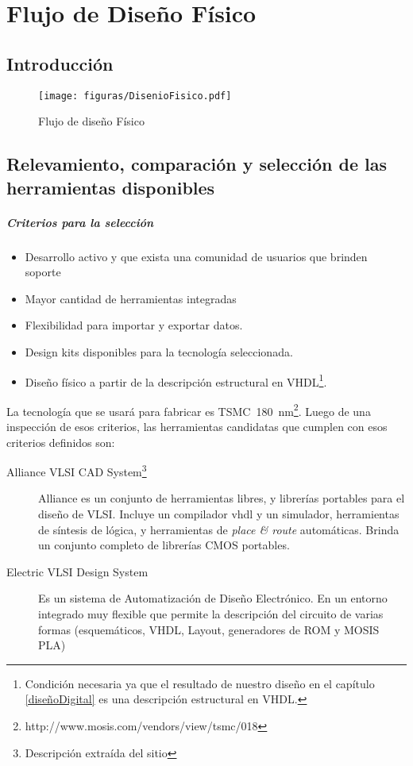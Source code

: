 \chapter{Flujo de Diseño Físico}
\section{Introducción}
\begin{figure}[h]
\centering
\texttt{[image: figuras/DisenioFisico.pdf]}
  \caption{Flujo de diseño Físico}
  \label{fig:diseñoFisico}
\end{figure}


\section{Relevamiento, comparación y selección de las herramientas disponibles}
\paragraph{Criterios para la selección}
\begin{itemize}
\item Desarrollo activo y que exista una comunidad de usuarios que brinden soporte
\item Mayor cantidad de herramientas integradas
\item Flexibilidad para importar y exportar datos. 
\item Design kits disponibles para la tecnología seleccionada.
\item Diseño físico a partir de la descripción estructural en VHDL\footnote{Condición necesaria ya que el resultado de nuestro diseño en el capítulo \ref{diseñoDigital} es una descripción estructural en VHDL.}.
\end{itemize}

La tecnología que se usará para fabricar es TSMC~180~nm\footnote{http://www.mosis.com/vendors/view/tsmc/018}.
Luego de una inspección de esos criterios, las herramientas candidatas que cumplen con esos criterios definidos son:

\begin{description}
\item[Alliance VLSI CAD System\footnote{Descripción extraída del sitio}]Alliance es un conjunto de herramientas libres, y librerías portables para el diseño de VLSI. Incluye un compilador vhdl y un simulador, herramientas de síntesis de lógica, y herramientas de \emph{place \& route} automáticas. Brinda un conjunto completo de librerías CMOS portables.

\item[Electric VLSI Design System] Es un sistema de Automatización de Diseño Electrónico. En un entorno integrado muy flexible que permite la descripción del circuito de varias formas (esquemáticos, VHDL, Layout, generadores de ROM y MOSIS PLA)   

\end{description}

